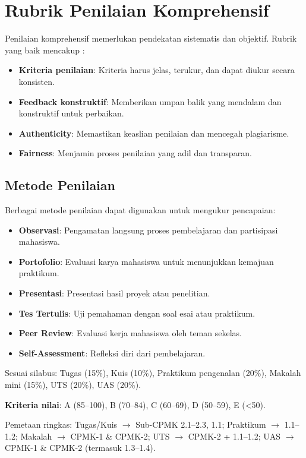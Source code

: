 ﻿\section{Rubrik Penilaian Komprehensif}

Penilaian komprehensif memerlukan pendekatan sistematis dan objektif. Rubrik yang baik mencakup \cite{stallings2017}:
\begin{itemize}
  \item \textbf{Kriteria penilaian}: Kriteria harus jelas, terukur, dan dapat diukur secara konsisten.
  \item \textbf{Feedback konstruktif}: Memberikan umpan balik yang mendalam dan konstruktif untuk perbaikan.
  \item \textbf{Authenticity}: Memastikan keaslian penilaian dan mencegah plagiarisme.
  \item \textbf{Fairness}: Menjamin proses penilaian yang adil dan transparan.
\end{itemize}


\subsection{Metode Penilaian}

Berbagai metode penilaian dapat digunakan untuk mengukur pencapaian:
\begin{itemize}
  \item \textbf{Observasi}: Pengamatan langsung proses pembelajaran dan partisipasi mahasiswa.
  \item \textbf{Portofolio}: Evaluasi karya mahasiswa untuk menunjukkan kemajuan praktikum.
  \item \textbf{Presentasi}: Presentasi hasil proyek atau penelitian.
  \item \textbf{Tes Tertulis}: Uji pemahaman dengan soal esai atau praktikum.
  \item \textbf{Peer Review}: Evaluasi kerja mahasiswa oleh teman sekelas.
  \item \textbf{Self-Assessment}: Refleksi diri dari pembelajaran.
\end{itemize}

Sesuai silabus: Tugas (15\%), Kuis (10\%), Praktikum pengenalan (20\%), Makalah mini (15\%), UTS (20\%), UAS (20\%).

\textbf{Kriteria nilai}: A (85--100), B (70--84), C (60--69), D (50--59), E (<50).

Pemetaan ringkas: Tugas/Kuis $\rightarrow$ Sub-CPMK 2.1--2.3, 1.1; Praktikum $\rightarrow$ 1.1--1.2; Makalah $\rightarrow$ CPMK-1 \& CPMK-2; UTS $\rightarrow$ CPMK-2 + 1.1--1.2; UAS $\rightarrow$ CPMK-1 \& CPMK-2 (termasuk 1.3--1.4).


